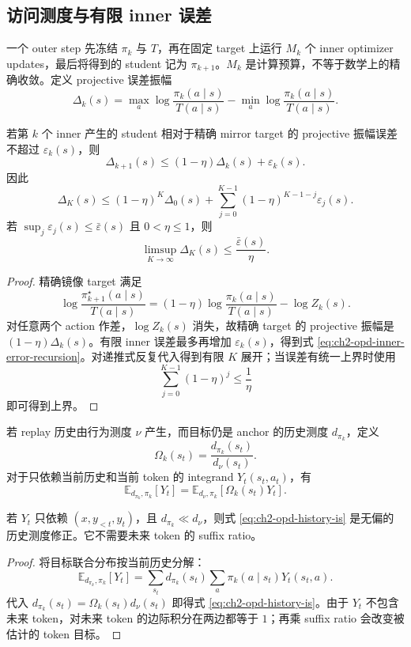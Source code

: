 \subsection{访问测度与有限 inner 误差}
\label{subsec:ch2-opd-access-and-inner-error}

一个 outer step 先冻结 $\pi_k$ 与 $T$，再在固定 target 上运行 $M_k$ 个 inner optimizer updates，最后将得到的 student 记为 $\pi_{k+1}$。$M_k$ 是计算预算，不等于数学上的精确收敛。定义 projective 误差振幅
\[
 \Delta_k(s)=\max_{a}\log\frac{\pi_k(a\mid s)}{T(a\mid s)}
 -\min_{a}\log\frac{\pi_k(a\mid s)}{T(a\mid s)}.
\]

\begin{proposition}
\label{prop:ch2-opd-inner-error}
若第 $k$ 个 inner 产生的 student 相对于精确 mirror target 的 projective 振幅误差不超过 $\varepsilon_k(s)$，则
\begin{equation}
\label{eq:ch2-opd-inner-error-recursion}
 \Delta_{k+1}(s)
 \leq (1-\eta)\Delta_k(s)+\varepsilon_k(s).
\end{equation}
因此
\[
 \Delta_K(s)\leq(1-\eta)^K\Delta_0(s)
 +\sum_{j=0}^{K-1}(1-\eta)^{K-1-j}\varepsilon_j(s).
\]
若 $\sup_j\varepsilon_j(s)\leq\bar\varepsilon(s)$ 且 $0<\eta\leq1$，则
\[
 \limsup_{K\to\infty}\Delta_K(s)\leq\frac{\bar\varepsilon(s)}{\eta}.
\]
\end{proposition}

\begin{proof}
精确镜像 target 满足
\[
 \log\frac{\pi_{k+1}^{\star}(a\mid s)}{T(a\mid s)}
 =(1-\eta)\log\frac{\pi_k(a\mid s)}{T(a\mid s)}-\log Z_k(s).
\]
对任意两个 action 作差，$\log Z_k(s)$ 消失，故精确 target 的 projective 振幅是 $(1-\eta)\Delta_k(s)$。有限 inner 误差最多再增加 $\varepsilon_k(s)$，得到式 \eqref{eq:ch2-opd-inner-error-recursion}。对递推式反复代入得到有限 $K$ 展开；当误差有统一上界时使用
\[
 \sum_{j=0}^{K-1}(1-\eta)^j\leq\frac1\eta
\]
即可得到上界。
\end{proof}

若 replay 历史由行为测度 $\nu$ 产生，而目标仍是 anchor 的历史测度 $d_{\pi_k}$，定义
\[
 \Omega_k(s_t)=\frac{d_{\pi_k}(s_t)}{d_\nu(s_t)}.
\]
对于只依赖当前历史和当前 token 的 integrand $Y_t(s_t,a_t)$，有
\begin{equation}
\label{eq:ch2-opd-history-is}
 \mathbb E_{d_{\pi_k},\pi_k}[Y_t]
 =\mathbb E_{d_\nu,\pi_k}[\Omega_k(s_t)Y_t].
\end{equation}

\begin{proposition}
\label{prop:ch2-local-access-measure}
若 $Y_t$ 只依赖 $(x,y_{<t},y_t)$，且 $d_{\pi_k}\ll d_\nu$，则式 \eqref{eq:ch2-opd-history-is} 是无偏的历史测度修正。它不需要未来 token 的 suffix ratio。
\end{proposition}

\begin{proof}
将目标联合分布按当前历史分解：
\[
 \mathbb E_{d_{\pi_k},\pi_k}[Y_t]
 =\sum_{s_t}d_{\pi_k}(s_t)\sum_a\pi_k(a\mid s_t)Y_t(s_t,a).
\]
代入 $d_{\pi_k}(s_t)=\Omega_k(s_t)d_\nu(s_t)$ 即得式 \eqref{eq:ch2-opd-history-is}。由于 $Y_t$ 不包含未来 token，对未来 token 的边际积分在两边都等于 $1$；再乘 suffix ratio 会改变被估计的 token 目标。
\end{proof}
